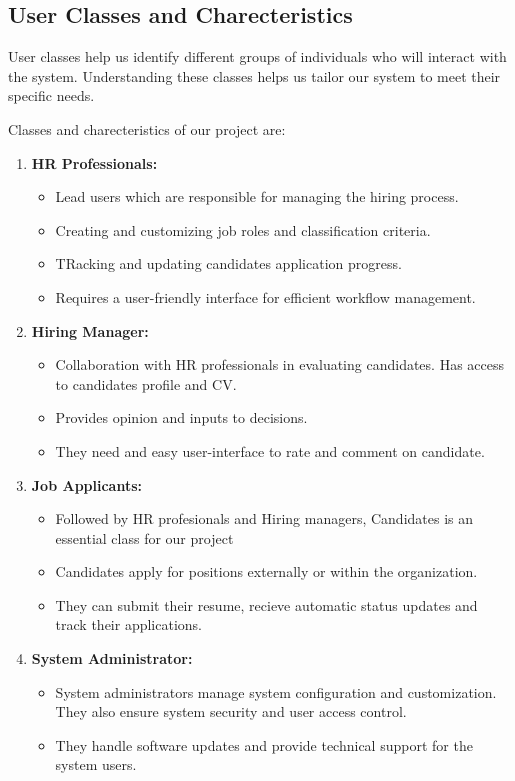\subsection{User Classes and Charecteristics}
User classes help us identify different groups of individuals who will interact with the system. Understanding these classes helps us tailor our system to meet their specific needs.

Classes and charecteristics of our project are:
\begin{enumerate}
    \item \textbf{HR Professionals:}
		\begin{itemize}
			\item Lead users which are responsible for managing the hiring process.
			\item Creating and customizing job roles and classification criteria.
			\item TRacking and updating candidates application progress.
			\item Requires a user-friendly interface for efficient workflow management.
		\end{itemize}
    \item \textbf{Hiring Manager:}
		\begin{itemize}
			\item Collaboration with HR professionals in evaluating candidates. Has access to candidates profile and CV.
			\item Provides opinion and inputs to decisions.
			\item	They need and easy user-interface to rate and comment on candidate.
		\end{itemize}
    \item \textbf{Job Applicants:}
		\begin{itemize}
			\item Followed by HR profesionals and Hiring managers, Candidates is an essential class for our project
			\item Candidates apply for positions externally or within the organization.
			\item They can submit their resume, recieve automatic status updates and track their applications.
		\end{itemize}
    \item \textbf{System Administrator:}
		\begin{itemize}
			\item System administrators manage system configuration and customization. They also ensure system security and user access control.
			\item They handle software updates and provide technical support for the system users.
		\end{itemize}
\end{enumerate}


